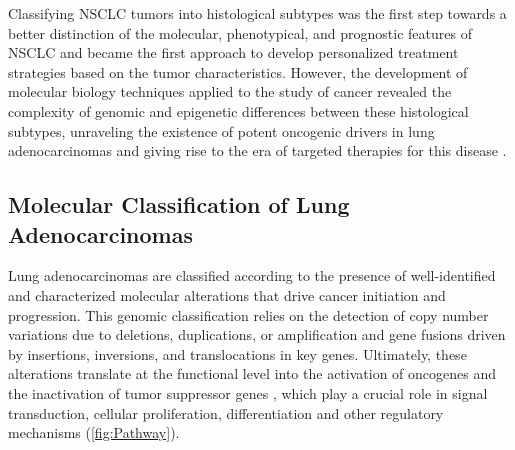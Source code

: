 \begin{itemize}
\end{itemize}


Classifying NSCLC tumors into histological subtypes was the first step towards a better distinction of the molecular, phenotypical, and prognostic features of NSCLC and became the first approach to develop personalized treatment strategies based on the tumor characteristics. However, the development of molecular biology techniques applied to the study of cancer revealed the complexity of genomic and epigenetic differences between these histological subtypes, unraveling the existence of potent oncogenic drivers in lung adenocarcinomas and giving rise to the era of targeted therapies for this disease \cite{Mol_bio}.

\subsection{Molecular Classification of Lung Adenocarcinomas}

Lung adenocarcinomas are classified according to the presence of well-identified and characterized molecular alterations that drive cancer initiation and progression. This genomic classification relies on the detection of copy number variations due to deletions, duplications, or amplification and gene fusions driven by insertions, inversions, and translocations in key genes. Ultimately, these alterations translate at the functional level into the activation of oncogenes and the inactivation of tumor suppressor genes \cite{Mol_markers, Gene_express}, which play a crucial role in signal transduction, cellular proliferation, differentiation and other regulatory mechanisms (\autoref{fig:Pathway}).


